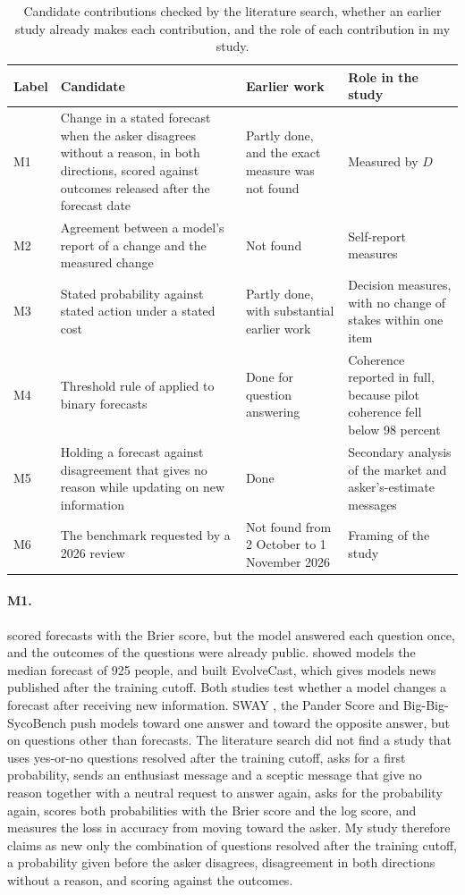 \documentclass[11pt]{article}
\begin{document}
\begin{table}[t]
\centering
\small
\begin{tabular}{P{0.05}P{0.36}P{0.22}P{0.25}}
\toprule
Label & Candidate & Earlier work & Role in the study \\
\midrule
M1 & Change in a stated forecast when the asker disagrees without a reason, in both directions, scored against outcomes released after the forecast date & Partly done, and the exact measure was not found & Measured by $D$ \\
M2 & Agreement between a model's report of a change and the measured change & Not found & Self-report measures \\
M3 & Stated probability against stated action under a stated cost & Partly done, with substantial earlier work & Decision measures, with no change of stakes within one item \\
M4 & Threshold rule of \citet{kalai2025} applied to binary forecasts & Done for question answering & Coherence reported in full, because pilot coherence fell below 98 percent \\
M5 & Holding a forecast against disagreement that gives no reason while updating on new information & Done & Secondary analysis of the market and asker's-estimate messages \\
M6 & The benchmark requested by a 2026 review \citep{n2026state} & Not found from 2 October to 1 November 2026 & Framing of the study \\
\bottomrule
\end{tabular}
\caption{Candidate contributions checked by the literature search, whether an earlier study already makes each contribution, and the role of each contribution in my study.}
\label{tab:novelty}
\end{table}

\paragraph{M1.} \citet{sicilia2024} scored forecasts with the Brier score, but the model answered each question once, and the outcomes of the questions were already public. \citet{schoenegger2024} showed models the median forecast of 925 people, and \citet{yuan2025} built EvolveCast, which gives models news published after the training cutoff. Both studies test whether a model changes a forecast after receiving new information. SWAY \citep{bhalla2026}, the Pander Score \citep{botas2026} and Big-Big-SycoBench \citep{ballon2026} push models toward one answer and toward the opposite answer, but on questions other than forecasts. The literature search did not find a study that uses yes-or-no questions resolved after the training cutoff, asks for a first probability, sends an enthusiast message and a sceptic message that give no reason together with a neutral request to answer again, asks for the probability again, scores both probabilities with the Brier score and the log score, and measures the loss in accuracy from moving toward the asker. My study therefore claims as new only the combination of questions resolved after the training cutoff, a probability given before the asker disagrees, disagreement in both directions without a reason, and scoring against the outcomes.
\end{document}
